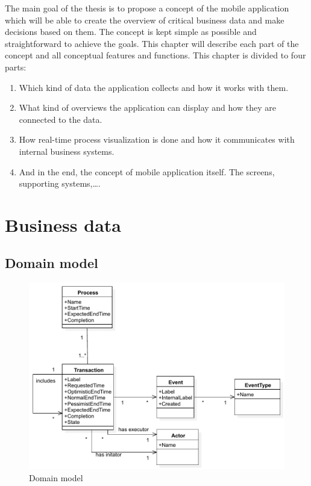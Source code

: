
The main goal of the thesis is to propose a concept of the mobile application which will be able to create the overview of critical business data and make decisions based on them. The concept is kept simple as possible and straightforward to achieve the goals. This chapter will describe each part of the concept and all conceptual features and functions. This chapter is divided to four parts:	
    \begin{enumerate}
      \item Which kind of data the application collects and how it works with them.
      \item What kind of overviews the application can display and how they are connected to the data.
      \item How real-time process visualization is done and how it communicates with internal business systems.
      \item And in the end, the concept of mobile application itself. The screens, supporting systems,\dots {}.
    \end{enumerate}
    
    \section{Business data}
    
    \subsection{Domain model}    
      \begin{figure}[ht!]
        \centering
        \includegraphics[width=12cm,keepaspectratio]{img/domain-core-model}
        \caption{Domain model }
        \label{fig:domain-core-model}
      \end{figure}    
      
